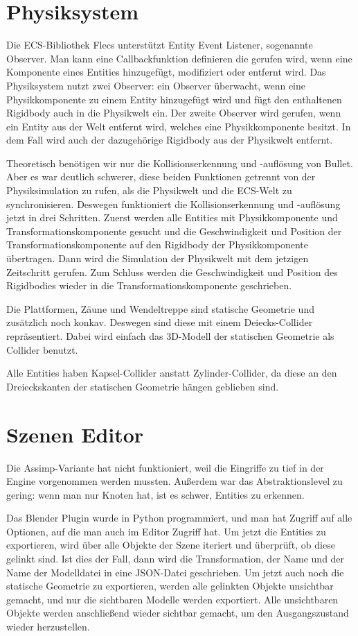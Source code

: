 \section{Physiksystem}

Die ECS-Bibliothek Flecs unterstützt Entity Event Listener, sogenannte Observer. Man kann eine Callbackfunktion definieren die gerufen wird, wenn eine Komponente eines Entities hinzugefügt, modifiziert oder entfernt wird. Das Physiksystem nutzt zwei Observer: ein Observer überwacht, wenn eine Physikkomponente zu einem Entity hinzugefügt wird und fügt den enthaltenen Rigidbody auch in die Physikwelt ein. Der zweite Observer wird gerufen, wenn ein Entity aus der Welt entfernt wird, welches eine Physikkomponente besitzt. In dem Fall wird auch der dazugehörige Rigidbody aus der Physikwelt entfernt.

Theoretisch benötigen wir nur die Kollisionserkennung und -auflösung von Bullet. Aber es war deutlich schwerer, diese beiden Funktionen getrennt von der Physiksimulation zu rufen, als die Physikwelt und die ECS-Welt zu synchronisieren. Deswegen funktioniert die Kollisionserkennung und -auflösung jetzt in drei Schritten. Zuerst werden alle Entities mit Physikkomponente und Transformationskomponente gesucht und die Geschwindigkeit und Position der Transformationskomponente auf den Rigidbody der Physikkomponente übertragen. Dann wird die Simulation der Physikwelt mit dem jetzigen Zeitschritt gerufen. Zum Schluss werden die Geschwindigkeit und Position des Rigidbodies wieder in die Transformationskomponente geschrieben.

Die Plattformen, Zäune und Wendeltreppe sind statische Geometrie und zusätzlich noch konkav. Deswegen sind diese mit einem Deiecks-Collider repräsentiert. Dabei wird einfach das 3D-Modell der statischen Geometrie als Collider benutzt.

Alle Entities haben Kapsel-Collider anstatt Zylinder-Collider, da diese an den Dreieckskanten der statischen Geometrie hängen geblieben sind.

\section{Szenen Editor}

Die Assimp-Variante hat nicht funktioniert, weil die Eingriffe zu tief in der Engine vorgenommen werden mussten. Außerdem war das Abstraktionslevel zu gering: wenn man nur Knoten hat, ist es schwer, Entities zu erkennen.

Das Blender Plugin wurde in Python programmiert, und man hat Zugriff auf alle Optionen, auf die man auch im Editor Zugriff hat. Um jetzt die Entities zu exportieren, wird über alle Objekte der Szene iteriert und überprüft, ob diese gelinkt sind. Ist dies der Fall, dann wird die Transformation, der Name und der Name der Modelldatei in eine JSON-Datei geschrieben. Um jetzt auch noch die statische Geometrie zu exportieren, werden alle gelinkten Objekte unsichtbar gemacht, und nur die sichtbaren Modelle werden exportiert. Alle unsichtbaren Objekte werden anschließend wieder sichtbar gemacht, um den Ausgangszustand wieder herzustellen.

